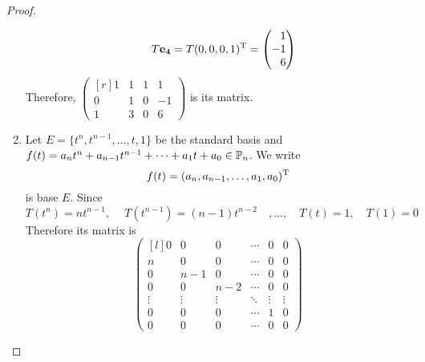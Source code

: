 \begin{proof}
\begin{enumerate}
\begin{align*}
        &&T\vec{e_4}=T(0,0,0,1)\tran= \begin{pmatrix*}[r] 1\\-1\\6 \end{pmatrix*}
      \end{align*}
      Therefore, 
      $ \begin{pmatrix*}[r]
        1&1&1&1\\
        0&1&0&-1\\
        1&3&0&6
      \end{pmatrix*} $
      is its matrix.
    \item Let $E=\{t^n,t^{n-1},\dots,t,1\}$ be the standard basis
      and $f(t)=a_nt^n+a_{n-1}t^{n-1}+\cdots+a_1t+a_0\in\P_n$. We write
      \[
        f(t)=(a_n, a_{n-1},\dots,a_1,a_0)^\mathrm{T}
      \]
      is base $E$. Since
      \[
        T(t^n)=nt^{n-1},\quad~T(t^{n-1})=(n-1)t^{n-2}\quad,\dots,\quad T(t)=1,\quad T(1)=0
      \]
      Therefore its matrix is 
      \[
        \begin{pmatrix*}[l]
          0&0&0&\cdots&0&0\\
          n&0&0&\cdots&0&0\\
          0&n-1&0&\cdots&0&0\\
          0&0&n-2&\cdots&0&0\\
          \vdots & \vdots & \vdots & \ddots &\vdots & \vdots\\
          0&0&0&\cdots&1&0\\
          0&0&0&\cdots&0&0
        \end{pmatrix*}
      \]

\end{enumerate}
\end{proof}
